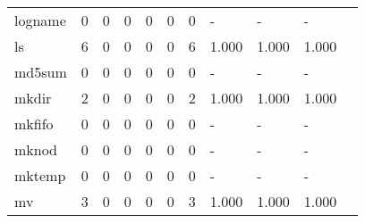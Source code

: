 \begin{longtable}{lp{1.10cm}p{1.10cm}p{1.10cm}p{1.10cm}p{1.10cm}p{1.10cm}p{1.10cm}p{1.10cm}p{1.10cm}p{1.10cm}}
logname   &                      0 &                                  0 &                                 0 &                                0 &                                 0 &                               0 &                              - &                                     - &                                   - \\
ls        &                      6 &                                  0 &                                 0 &                                0 &                                 0 &                               6 &                          1.000 &                                 1.000 &                               1.000 \\
md5sum    &                      0 &                                  0 &                                 0 &                                0 &                                 0 &                               0 &                              - &                                     - &                                   - \\
mkdir     &                      2 &                                  0 &                                 0 &                                0 &                                 0 &                               2 &                          1.000 &                                 1.000 &                               1.000 \\
mkfifo    &                      0 &                                  0 &                                 0 &                                0 &                                 0 &                               0 &                              - &                                     - &                                   - \\
mknod     &                      0 &                                  0 &                                 0 &                                0 &                                 0 &                               0 &                              - &                                     - &                                   - \\
mktemp    &                      0 &                                  0 &                                 0 &                                0 &                                 0 &                               0 &                              - &                                     - &                                   - \\
mv        &                      3 &                                  0 &                                 0 &                                0 &                                 0 &                               3 &                          1.000 &                                 1.000 &                               1.000 \\

\end{longtable}
